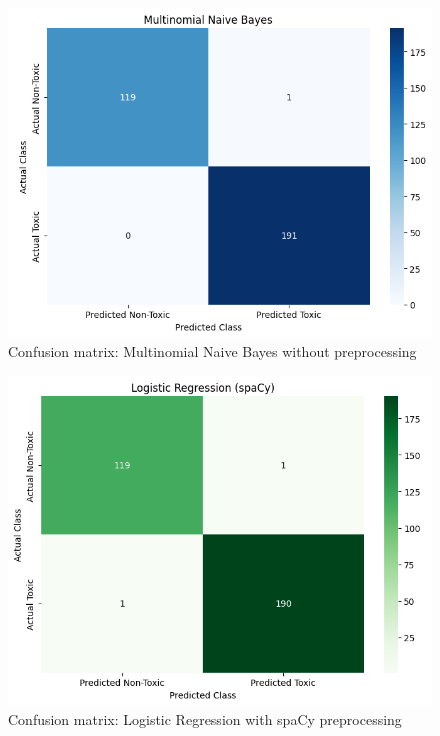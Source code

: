 \documentclass[conference]{IEEEtran}
\begin{document}
\begin{figure}[H]
  \centering
  \includegraphics[width=0.9\columnwidth]{figures/confusion_nb_no_pre.png}
  \caption{Confusion matrix: Multinomial Naive Bayes without preprocessing}
\end{figure}

\begin{figure}[H]
  \centering
  \includegraphics[width=0.9\columnwidth]{figures/confusion_lr_spacy.png}
  \caption{Confusion matrix: Logistic Regression with spaCy preprocessing}
\end{figure}
\end{document}
